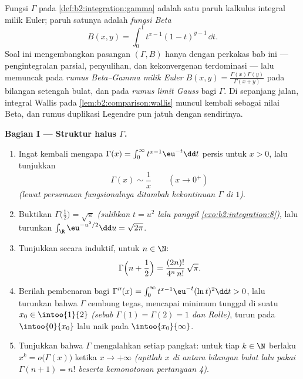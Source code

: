\begin{problem}\label{pb:b2:integration:1}
Fungsi $\Gamma$ pada \cref{def:b2:integration:gamma} adalah satu
paruh kalkulus integral milik Euler; paruh satunya adalah
\emph{fungsi Beta}
\[
B(x, y) = \int_0^1 t^{x-1}(1 - t)^{y-1}\,\dd t .
\]
Soal ini mengembangkan pasangan $(\Gamma, B)$ hanya dengan perkakas
bab ini --- pengintegralan parsial, penyulihan, dan
kekonvergenan terdominasi --- lalu memuncak pada \emph{rumus
Beta--Gamma milik Euler} $B(x,y) = \frac{\Gamma(x)\Gamma(y)}
{\Gamma(x+y)}$ pada bilangan setengah bulat, dan pada \emph{rumus limit
Gauss} bagi $\Gamma$. Di sepanjang jalan,
integral Wallis pada \cref{lem:b2:comparison:wallis} muncul kembali
sebagai nilai Beta, dan rumus duplikasi Legendre pun jatuh dengan sendirinya.

\medskip
\noindent\textbf{Bagian I --- Struktur halus $\Gamma$.}
\begin{enumerate}
  \item Ingat kembali mengapa $\Gamma(x) = \int_0^\infty
        t^{x-1}\eu^{-t}\dd t$  persis untuk $x > 0$, lalu tunjukkan
        \[
        \Gamma(x) \sim \frac1x \qquad (x \to 0^+)
        \]
        \emph{(lewat persamaan fungsionalnya ditambah kekontinuan
        $\Gamma$ di $1$)}.
  \item Buktikan $\Gamma\bigl(\tfrac12\bigr) = \sqrt\pi$
        \emph{(sulihkan $t = u^2$ lalu panggil
        \cref{exo:b2:integration:8})}, lalu turunkan
        $\int_\R \eu^{-u^2/2}\dd u = \sqrt{2\pi}$.
  \item Tunjukkan secara induktif, untuk $n \in \N$:
        \[
        \Gamma\Bigl(n + \frac12\Bigr)
        = \frac{(2n)!}{4^n\,n!}\,\sqrt\pi .
        \]
  \item Berilah pembenaran bagi $\Gamma''(x) = \int_0^\infty
        t^{x-1}\eu^{-t}(\ln t)^2\dd t > 0$, lalu turunkan bahwa
        $\Gamma$ cembung tegas, mencapai minimum tunggal di
        suatu $x_0 \in \intoo{1}{2}$ \emph{(sebab $\Gamma(1) =
        \Gamma(2) = 1$ dan Rolle)}, turun pada $\intoo{0}{x_0}$ lalu
        naik pada $\intoo{x_0}{\infty}$.
  \item Tunjukkan bahwa $\Gamma$ mengalahkan setiap pangkat: untuk tiap
        $k \in \N$ berlaku $x^k = o\bigl(\Gamma(x)\bigr)$ ketika $x \to
        +\infty$ \emph{(apitlah $x$ di antara bilangan bulat lalu pakai
        $\Gamma(n+1) = n!$ beserta kemonotonan pertanyaan 4)}.
\end{enumerate}


\end{problem}

